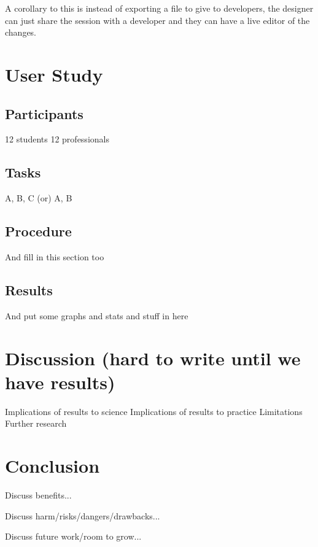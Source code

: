 \documentclass{sigchi}
\begin{document}
A corollary to this is instead of exporting a file to give to developers, the designer can just share the session with a developer and they can have a live editor of the changes.


\section{User Study}
\subsection{Participants}
12 students
12 professionals

\subsection{Tasks}
A, B, C (or) A, B

\subsection{Procedure}
And fill in this section too

\subsection{Results}
And put some graphs and stats and stuff in here

\section{Discussion (hard to write until we have results)}
Implications of results to science
Implications of results to practice 
Limitations
Further research 


\section{Conclusion}
Discuss benefits...

Discuss harm/risks/dangers/drawbacks...

Discuss future work/room to grow...







\balance{}



\end{document}

